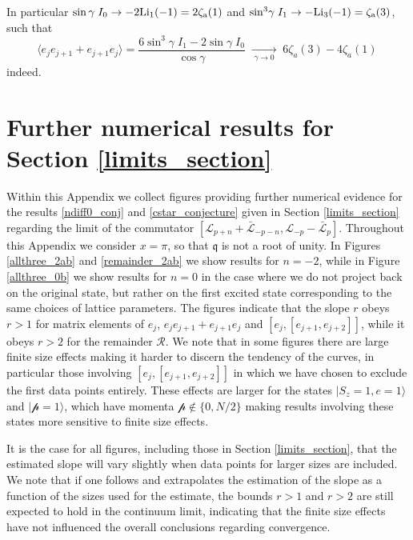 \documentclass[a4paper,10pt]{article}
\newcommand{\q}{\mathfrak{q}}
\newcommand{\KSgen}{\mathcal{L}}
\begin{document}
In particular $\sin\gamma \; I_0 \to  -2 \rm{Li}_1(-1) = 2 \zeta_a(1) $ and $\sin^3 \! \gamma \; I_1 \to  - \rm{Li}_3(-1) = \zeta_a(3) $, such that
\begin{equation}
 \langle e_j e_{j+1} + e_{j+1}e_j \rangle = \frac{ 6 \sin^3 \! \gamma \; I_1 -2 \sin \gamma \; I_0  }{\cos\gamma}  \;\xrightarrow[\; \gamma \to 0\;]{} \;
  6\zeta_a(3) - 4\zeta_a(1) \,
\end{equation}
indeed.


\FloatBarrier

\section{Further numerical results for Section \ref{limits_section}}
\label{limits_appendix}



Within this Appendix we collect figures providing further numerical evidence for the results \eqref{ndiff0_conj} and \eqref{cstar_conjecture}  given in Section \ref{limits_section} regarding the limit of the commutator $[\KSgen_{p+n}+\bar{\KSgen}_{-p-n},\KSgen_{-p}-\bar{\KSgen}_{p}] $. Throughout this Appendix we consider $x=\pi$, so that $\q$ is not a root of unity. 
%
In Figures \ref{allthree_2ab} and \ref{remainder_2ab} we show results for $n=-2$, while in Figure \ref{allthree_0b}  we show results for $n=0$ in the case where we do not project back on the original state, but rather on the first excited state corresponding to the same choices of lattice parameters. The figures indicate that the slope $r$ obeys $r>1$ for matrix elements of $e_j$, $e_j e_{j+1} + e_{j+1}e_j$ and $[e_j, [ e_{j+1}, e_{j+2}] ]$, while it obeys $r>2$  for the remainder $\mathcal{R}$.  
We note that in some figures there are large finite size effects making it harder to discern the tendency of the curves, in particular those involving $[e_j, [ e_{j+1}, e_{j+2}] ]$ in which we have chosen to exclude the first data points entirely.  These effects are larger for the states $|S_z=1,e=1\rangle$ and $| \mathcal{p} = 1 \rangle$, which have momenta $\mathcal{p} \notin \{0,N/2\}$ making results involving these states more sensitive to finite size effects.

It is the case for all figures, including those in Section \ref{limits_section}, that the estimated slope will vary slightly when data points for larger sizes are included.
We note that if one follows and extrapolates the estimation of the slope as a function of the sizes used for the estimate, the bounds $r>1$ and $r>2$ are still expected to hold in the continuum limit, indicating that the finite size effects have not influenced the overall conclusions regarding convergence. 
\end{document}
